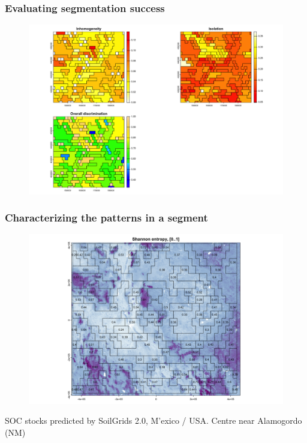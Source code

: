 \documentclass[aspectratio=169, 10pt]{beamer}
\begin{document}
 \begin{frame}
        \frametitle{Evaluating segmentation success}
    \begin{figure}
        \centering        \includegraphics[height=0.75\textheight]{graphics_david/all-files-resolutions-4.png}
      \end{figure}
  \end{frame}

  \begin{frame}
    \frametitle{Characterizing the patterns in a segment}
    \begin{figure}
        \centering        \includegraphics[height=0.65\textheight]{graphics_david/compute-sg-nm-8M-3.png}
      \end{figure}
{\footnotesize SOC stocks predicted by SoilGrids 2.0, M'{e}xico / USA. Centre near Alamogordo (NM)}
  \end{frame}
  
\end{document}
